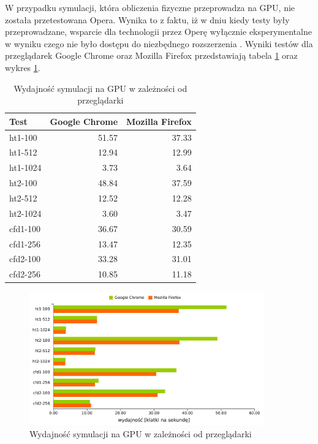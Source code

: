 W przypadku symulacji, która obliczenia fizyczne przeprowadza na GPU, nie
została przetestowana Opera. Wynika to z faktu, iż w dniu kiedy testy były
przeprowadzane, wsparcie dla technologii  przez Operę wyłącznie
eksperymentalne w wyniku czego nie było dostępu do niezbędnego rozszerzenia
. Wyniki testów dla przeglądarek Google Chrome oraz
Mozilla Firefox przedstawiają tabela \ref{tab:przegladarkiGPU} oraz wykres
\ref{fig:browserPerfGPU}.

\begin{table}[H]
\caption{Wydajność symulacji na GPU w zależności od przeglądarki}
\centering
\begin{tabular}{|l|r|r|}
\hline
Test & Google Chrome & Mozilla Firefox \\ \hline
ht1-100 & 51.57 & 37.33 \\ \hline
ht1-512 & 12.94 & 12.99 \\ \hline
ht1-1024 & 3.73 & 3.64 \\ \hline
ht2-100 & 48.84 & 37.59 \\ \hline
ht2-512 & 12.52 & 12.28 \\ \hline
ht2-1024 & 3.60 & 3.47 \\ \hline
\hline
cfd1-100 & 36.67 & 30.59 \\ \hline
cfd1-256 & 13.47 & 12.35 \\ \hline
cfd2-100 & 33.28 & 31.01 \\ \hline
cfd2-256 & 10.85 & 11.18 \\ \hline
\end{tabular}
\label{tab:przegladarkiGPU}
\end{table}

\begin{figure}[H]
\centering
\includegraphics[width=0.9\textwidth]{img/browserPerfGPU}
\caption{Wydajność symulacji na GPU w zależności od przeglądarki}
\label{fig:browserPerfGPU}
\end{figure}

